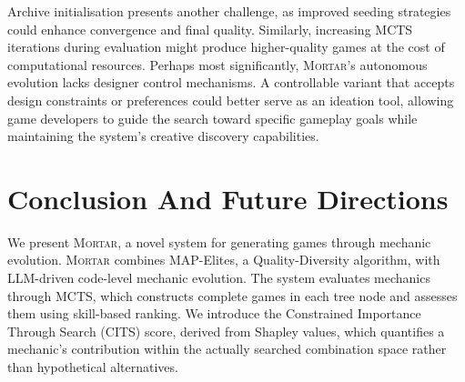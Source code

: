 \documentclass{article} %
\newcommand{\name}{\textsc{Mortar}}
\begin{document}
Archive initialisation presents another challenge, as improved seeding strategies could enhance convergence and final quality. Similarly, increasing MCTS iterations during evaluation might produce higher-quality games at the cost of computational resources. Perhaps most significantly, \name{}'s autonomous evolution lacks designer control mechanisms. A controllable variant that accepts design constraints or preferences could better serve as an ideation tool, allowing game developers to guide the search toward specific gameplay goals while maintaining the system's creative discovery capabilities.



\section{Conclusion And Future Directions}

 We present \name{}, a novel system for generating games through mechanic evolution. \name{} combines MAP-Elites, a Quality-Diversity algorithm, with LLM-driven code-level mechanic evolution. The system evaluates mechanics through MCTS, which constructs complete games in each tree node and assesses them using skill-based ranking. We introduce the Constrained Importance Through Search (CITS) score, derived from Shapley values, which quantifies a mechanic's contribution within the actually searched combination space rather than hypothetical alternatives.
\end{document}
